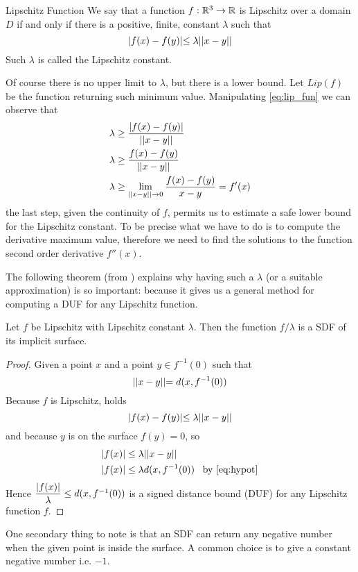 \begin{definition}{Lipschitz Function}
We say that a function $f : \mathbb{R}^3 \to \mathbb{R}$ is Lipschitz over a domain $D$ if and only if there is a positive, finite, constant $\lambda$ such that
\begin{equation}\label{eq:lip_fun}
\lvert f(x) - f(y) \lvert \leq \lambda \lvert\lvert x - y \lvert\lvert
\end{equation}
Such $\lambda$ is called the Lipschitz constant.
\end{definition}
\noindent
Of course there is no upper limit to $\lambda$, but there is a lower bound.
Let $Lip(f)$ be the function returning such minimum value.
Manipulating \autoref{eq:lip_fun} we can observe that
\begin{align*}
  \lambda &\geq \dfrac{\abs{f(x) - f(y)}}{\norm{x - y}} \\
  \lambda &\geq \dfrac{f(x) - f(y)}{\norm{x - y}} \\ %
  \lambda &\geq \lim_{\norm{x-y} \to 0} \dfrac{f(x) - f(y)}{x - y} = f'(x)
\end{align*}
the last step, given the continuity of $f$, permits us to estimate a safe lower bound for the Lipschitz constant.
To be precise what we have to do is to compute the derivative maximum value, therefore we need to find the solutions to the function second order derivative $f''(x)$.

The following theorem (from \cite{hart1996}) explains why having such a $\lambda$ (or a suitable approximation) is so important: because it gives us a general method for computing a DUF for any Lipschitz function.
\begin{theorem}
  Let $f$ be Lipschitz with Lipschitz constant $\lambda$.
  Then the function $f / \lambda$ is a SDF of its implicit surface.
\end{theorem}
\begin{proof}
  Given a point $x$ and a point $y \in f^{-1}(0)$ such that
  \begin{equation}
  \label{eq:hypot}
    \lvert\lvert x - y \lvert\lvert = d(x, f^{-1}(0))
  \end{equation}
  Because $f$ is Lipschitz, holds
  $$ \lvert f(x) - f(y) \lvert \leq \lambda \lvert\lvert x - y \lvert\lvert $$
  and because $y$ is on the surface $f(y) = 0$, so
  \begin{align*}
    \abs{f(x)} &\leq \lambda \norm{x - y} \\
    \abs{f(x)} &\leq \lambda d(x, f^{-1}(0)) \;\;\; \text{by \autoref{eq:hypot}}
  \end{align*}
  Hence
  $ \dfrac{\lvert f(x) \lvert}{\lambda} \leq d(x, f^{-1}(0)) $
  is a signed distance bound (DUF) for any Lipschitz function $f$.
\end{proof}
One secondary thing to note is that an SDF can return any negative number when the given point is inside the surface.
A common choice is to give a constant negative number i.e. $-1$.

